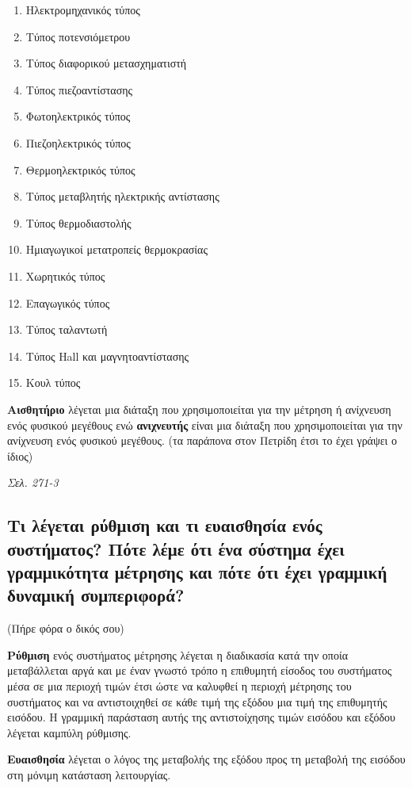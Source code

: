 \documentclass{article}
\begin{document}
\begin{enumerate}
    \item Ηλεκτρομηχανικός τύπος 
    \item Τύπος ποτενσιόμετρου
    \item Τύπος διαφορικού μετασχηματιστή
    \item Τύπος πιεζοαντίστασης
    \item Φωτοηλεκτρικός τύπος
    \item Πιεζοηλεκτρικός τύπος 
    \item Θερμοηλεκτρικός τύπος
    \item Τύπος μεταβλητής ηλεκτρικής αντίστασης
    \item Τύπος θερμοδιαστολής
    \item Ημιαγωγικοί μετατροπείς θερμοκρασίας
    \item Χωρητικός τύπος 
    \item Επαγωγικός τύπος
    \item Τύπος ταλαντωτή
    \item Τύπος \foreignlanguage{english}{Hall} και μαγνητοαντίστασης
    \item Κουλ τύπος
\end{enumerate}

\textbf{Αισθητήριο} λέγεται μια διάταξη που χρησιμοποιείται για την μέτρηση ή ανίχνευση ενός φυσικού μεγέθους ενώ \textbf{ανιχνευτής} είναι μια διάταξη που 
χρησιμοποιείται για την ανίχνευση ενός φυσικού μεγέθους. (τα παράπονα στον Πετρίδη έτσι το έχει γράψει ο ίδιος)

\emph{Σελ. 271-3}
\subsection{Τι λέγεται ρύθμιση και τι ευαισθησία ενός συστήματος? Πότε λέμε ότι ένα σύστημα έχει γραμμικότητα μέτρησης και πότε ότι έχει γραμμική δυναμική συμπεριφορά?}
\scriptsize (Πήρε φόρα ο δικός σου)
\normalsize

\textbf{Ρύθμιση} ενός συστήματος μέτρησης λέγεται η διαδικασία κατά την οποία μεταβάλλεται αργά και με έναν γνωστό τρόπο η επιθυμητή είσοδος του συστήματος μέσα σε μια
περιοχή τιμών έτσι ώστε να καλυφθεί η περιοχή μέτρησης του συστήματος και να αντιστοιχηθεί σε κάθε τιμή της εξόδου μια τιμή της επιθυμητής εισόδου. Η γραμμική παράσταση
αυτής της αντιστοίχησης τιμών εισόδου και εξόδου λέγεται καμπύλη ρύθμισης.

\textbf{Ευαισθησία} λέγεται ο λόγος της μεταβολής της εξόδου προς τη μεταβολή της εισόδου στη μόνιμη κατάσταση λειτουργίας.
\end{document}

